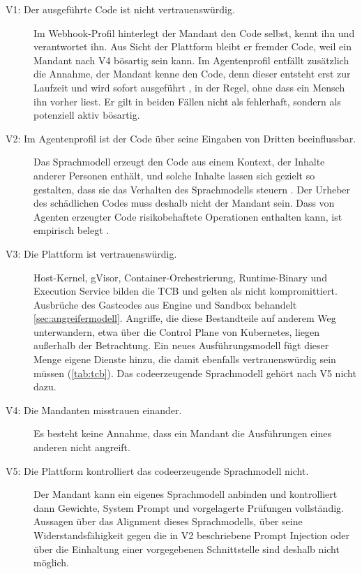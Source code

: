 \begin{description}
  \item[V1: Der ausgeführte Code ist nicht vertrauenswürdig.] Im Webhook-Profil hinterlegt der
    Mandant den Code selbst, kennt ihn und verantwortet ihn. Aus Sicht der Plattform bleibt er
    fremder Code, weil ein Mandant nach V4 bösartig sein kann. Im Agentenprofil entfällt
    zusätzlich die Annahme, der Mandant kenne den Code, denn dieser entsteht erst zur Laufzeit und wird sofort ausgeführt \autocite[S.~50208]{wang_executable_2024}, in der Regel, ohne dass ein Mensch ihn vorher liest. Er gilt in beiden Fällen nicht als fehlerhaft, sondern als
    potenziell aktiv bösartig.

  \item[V2: Im Agentenprofil ist der Code über seine Eingaben von Dritten beeinflussbar.] Das
    Sprachmodell erzeugt den Code aus einem Kontext, der Inhalte anderer Personen enthält, und solche
    Inhalte lassen sich gezielt so gestalten, dass sie das Verhalten des Sprachmodells steuern
    \autocite[S.~79--80]{greshake_not_2023}. Der Urheber des schädlichen Codes muss deshalb nicht der
    Mandant sein. Dass von Agenten erzeugter Code risikobehaftete Operationen enthalten kann, ist
    empirisch belegt \autocite[S.~106192]{guo_redcode_2024}.

  \item[V3: Die Plattform ist vertrauenswürdig.] Host-Kernel, gVisor, Container-Orchestrierung,
    Runtime-Binary und Execution Service bilden die \ac{TCB} und gelten als nicht kompromittiert. Ausbrüche des
    Gastcodes aus Engine und Sandbox behandelt \autoref{sec:angreifermodell}.
    Angriffe, die diese Bestandteile auf anderem Weg unterwandern, etwa über die
    Control Plane von Kubernetes, liegen außerhalb der Betrachtung. Ein neues Ausführungsmodell fügt dieser Menge eigene
    Dienste hinzu, die damit ebenfalls vertrauenswürdig sein müssen (\autoref{tab:tcb}). Das codeerzeugende Sprachmodell
    gehört nach V5 nicht dazu.

  \item[V4: Die Mandanten misstrauen einander.] Es besteht keine Annahme, dass ein Mandant die
    Ausführungen eines anderen nicht angreift.

  \item[V5: Die Plattform kontrolliert das codeerzeugende Sprachmodell nicht.] Der Mandant
    kann ein eigenes Sprachmodell anbinden und kontrolliert dann Gewichte, System Prompt und
    vorgelagerte Prüfungen vollständig. Aussagen über das Alignment dieses Sprachmodells, über seine
    Widerstandsfähigkeit gegen die in V2 beschriebene Prompt Injection oder über die Einhaltung
    einer vorgegebenen Schnittstelle sind deshalb nicht möglich.
\end{description}

